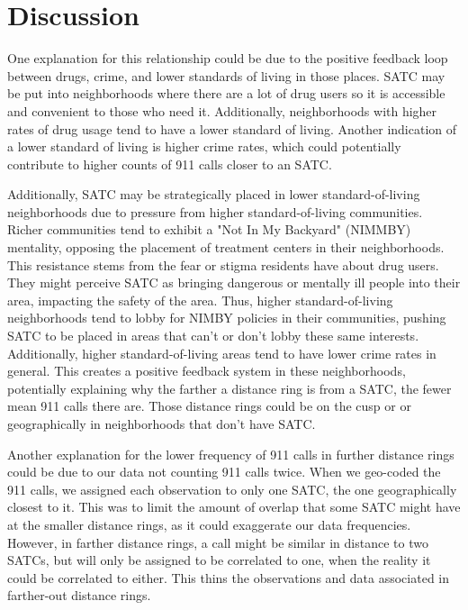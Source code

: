 \documentclass[12pt]{article}
\begin{document}



\section{Discussion}
\label{sec:discussion}

One explanation for this relationship could be due to the positive feedback loop between drugs, crime, and lower standards of living in those places. SATC may be put into neighborhoods where there are a lot of drug users so it is accessible and convenient to those who need it. Additionally, neighborhoods with higher rates of drug usage tend to have a lower standard of living. Another indication of a lower standard of living is higher crime rates, which could potentially contribute to higher counts of 911 calls closer to an SATC. 

Additionally, SATC may be strategically placed in lower standard-of-living neighborhoods due to pressure from higher standard-of-living communities. Richer communities tend to exhibit a "Not In My Backyard" (NIMMBY) mentality, opposing the placement of treatment centers in their neighborhoods. This resistance stems from the fear or stigma residents have about drug users. They might perceive SATC as bringing dangerous or mentally ill people into their area, impacting the safety of the area. Thus, higher standard-of-living neighborhoods tend to lobby for NIMBY policies in their communities, pushing SATC to be placed in areas that can't or don't lobby these same interests. Additionally, higher standard-of-living areas tend to have lower crime rates in general. This creates a positive feedback system in these neighborhoods, potentially explaining why the farther a distance ring is from a SATC, the fewer mean 911 calls there are. Those distance rings could be on the cusp or or geographically in neighborhoods that don't have SATC. 
    
Another explanation for the lower frequency of 911 calls in further distance rings could be due to our data not counting 911 calls twice. When we geo-coded the 911 calls, we assigned each observation to only one SATC, the one geographically closest to it. This was to limit the amount of overlap that some SATC might have at the smaller distance rings, as it could exaggerate our data frequencies. However, in farther distance rings, a call might be similar in distance to two SATCs, but will only be assigned to be correlated to one, when the reality it could be correlated to either. This thins the observations and data associated in farther-out distance rings. 
\end{document}
